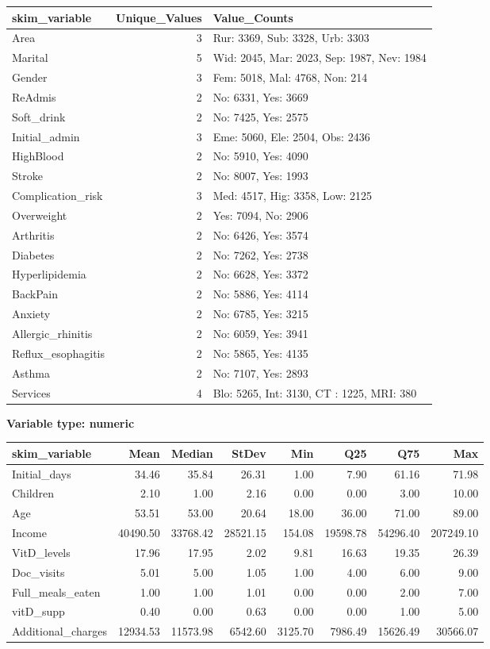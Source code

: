 \documentclass[
]{article}
\begin{document}
\begin{longtable}[]{@{}lrl@{}}
\toprule
skim\_variable & Unique\_Values & Value\_Counts \\
\midrule
\endhead
Area & 3 & Rur: 3369, Sub: 3328, Urb: 3303 \\
Marital & 5 & Wid: 2045, Mar: 2023, Sep: 1987, Nev: 1984 \\
Gender & 3 & Fem: 5018, Mal: 4768, Non: 214 \\
ReAdmis & 2 & No: 6331, Yes: 3669 \\
Soft\_drink & 2 & No: 7425, Yes: 2575 \\
Initial\_admin & 3 & Eme: 5060, Ele: 2504, Obs: 2436 \\
HighBlood & 2 & No: 5910, Yes: 4090 \\
Stroke & 2 & No: 8007, Yes: 1993 \\
Complication\_risk & 3 & Med: 4517, Hig: 3358, Low: 2125 \\
Overweight & 2 & Yes: 7094, No: 2906 \\
Arthritis & 2 & No: 6426, Yes: 3574 \\
Diabetes & 2 & No: 7262, Yes: 2738 \\
Hyperlipidemia & 2 & No: 6628, Yes: 3372 \\
BackPain & 2 & No: 5886, Yes: 4114 \\
Anxiety & 2 & No: 6785, Yes: 3215 \\
Allergic\_rhinitis & 2 & No: 6059, Yes: 3941 \\
Reflux\_esophagitis & 2 & No: 5865, Yes: 4135 \\
Asthma & 2 & No: 7107, Yes: 2893 \\
Services & 4 & Blo: 5265, Int: 3130, CT : 1225, MRI: 380 \\
\bottomrule
\end{longtable}

\textbf{Variable type: numeric}

\begin{longtable}[]{@{}lrrrrrrr@{}}
\toprule
skim\_variable & Mean & Median & StDev & Min & Q25 & Q75 & Max \\
\midrule
\endhead
Initial\_days & 34.46 & 35.84 & 26.31 & 1.00 & 7.90 & 61.16 & 71.98 \\
Children & 2.10 & 1.00 & 2.16 & 0.00 & 0.00 & 3.00 & 10.00 \\
Age & 53.51 & 53.00 & 20.64 & 18.00 & 36.00 & 71.00 & 89.00 \\
Income & 40490.50 & 33768.42 & 28521.15 & 154.08 & 19598.78 & 54296.40 &
207249.10 \\
VitD\_levels & 17.96 & 17.95 & 2.02 & 9.81 & 16.63 & 19.35 & 26.39 \\
Doc\_visits & 5.01 & 5.00 & 1.05 & 1.00 & 4.00 & 6.00 & 9.00 \\
Full\_meals\_eaten & 1.00 & 1.00 & 1.01 & 0.00 & 0.00 & 2.00 & 7.00 \\
vitD\_supp & 0.40 & 0.00 & 0.63 & 0.00 & 0.00 & 1.00 & 5.00 \\
Additional\_charges & 12934.53 & 11573.98 & 6542.60 & 3125.70 & 7986.49
& 15626.49 & 30566.07 \\
\bottomrule
\end{longtable}
\end{document}
